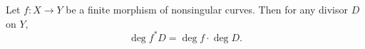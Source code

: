 Let $f: X \to Y$ be a finite morphism of nonsingular curves. Then for any divisor $D$ on $Y$,
$$\deg f^*D = \deg f \cdot \deg D.$$
